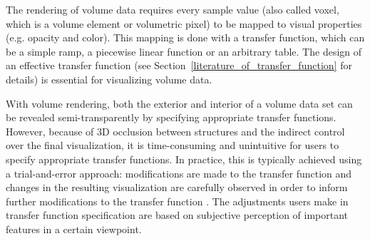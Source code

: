 The rendering of volume data requires every sample value (also called voxel, which is a volume element or volumetric pixel) to be mapped to visual properties (e.g. opacity and color). This mapping is done with a transfer function, which can be a simple ramp, a piecewise linear function or an arbitrary table.
The design of an effective transfer function (see Section~\ref{literature_of_transfer_function} for details) is essential for visualizing volume data.

With volume rendering, both the exterior and interior of a volume data set can be revealed semi-transparently by specifying appropriate transfer functions.
However, because of 3D occlusion between structures and the indirect control over the final visualization, it is time-consuming and unintuitive for users to specify appropriate transfer functions.
In practice, this is typically achieved using a trial-and-error approach: modifications are made to the transfer function and changes in the resulting visualization are carefully observed in order to inform further modifications to the transfer function \cite{kniss_interactive_2001}.
The adjustments users make in transfer function specification are based on subjective perception of important features in a certain viewpoint.

% 
%
%
 


